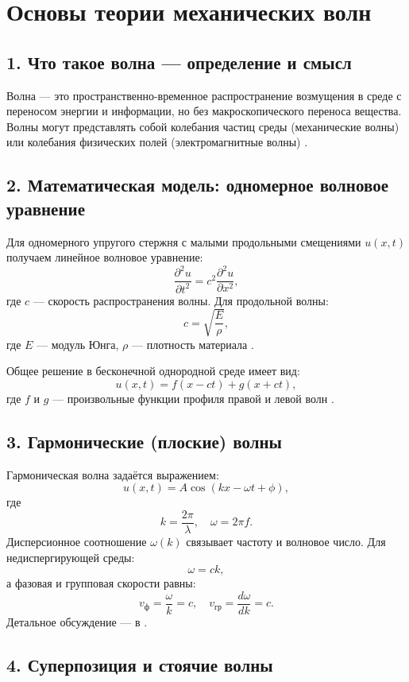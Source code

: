 \section*{Основы теории механических волн}

\subsection*{1. Что такое волна — определение и смысл}

Волна — это пространственно-временное распространение возмущения в среде с переносом 
энергии и информации, но без макроскопического переноса вещества. Волны могут представлять 
собой колебания частиц среды (механические волны) или колебания физических полей 
(электромагнитные волны) \cite{openstax-waves, feynman}.

\subsection*{2. Математическая модель: одномерное волновое уравнение}

Для одномерного упругого стержня с малыми продольными смещениями \(u(x,t)\) получаем 
линейное волновое уравнение:
\[
\frac{\partial^2 u}{\partial t^2} = c^2 \frac{\partial^2 u}{\partial x^2},
\]
где \(c\) — скорость распространения волны. Для продольной волны:
\[
c = \sqrt{\frac{E}{\rho}},
\]
где \(E\) — модуль Юнга, \(\rho\) — плотность материала \cite{mit803}.

Общее решение в бесконечной однородной среде имеет вид:
\[
u(x,t) = f(x - ct) + g(x + ct),
\]
где \(f\) и \(g\) — произвольные функции профиля правой и левой волн \cite{mit803}.

\subsection*{3. Гармонические (плоские) волны}

Гармоническая волна задаётся выражением:
\[
u(x,t) = A \cos(kx - \omega t + \phi),
\]
где
\[
k = \frac{2\pi}{\lambda}, \quad \omega = 2\pi f.
\]
Дисперсионное соотношение \(\omega(k)\) связывает частоту и волновое число.  
Для недиспергирующей среды:
\[
\omega = ck,
\]
а фазовая и групповая скорости равны:
\[
v_{\text{ф}} = \frac{\omega}{k} = c, \quad
v_{\text{гр}} = \frac{d\omega}{dk} = c.
\]
Детальное обсуждение — в \cite{openstax-waves, mit803}.

\subsection*{4. Суперпозиция и стоячие волны}

